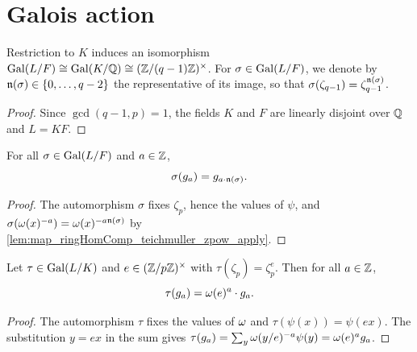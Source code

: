 \section{Galois action}

\begin{lemma}
  \label{lem:galFEquiv}
  \leanok
  Restriction to $K$ induces an isomorphism $\mathrm{Gal}(L/F) \cong \mathrm{Gal}(K/\mathbb{Q}) \cong
  (\mathbb{Z}/(q-1)\mathbb{Z})^\times$. For $\sigma \in \mathrm{Gal}(L/F)$, we denote by
  $\mathfrak{n}(\sigma) \in \{0, \ldots, q-2\}$ the representative of its image, so that
  $\sigma(\zeta_{q-1}) = \zeta_{q-1}^{\mathfrak{n}(\sigma)}$.
\end{lemma}

\begin{proof}
  \leanok
  Since $\gcd(q-1, p) = 1$, the fields $K$ and $F$ are linearly disjoint over $\mathbb{Q}$ and
  $L = KF$.
\end{proof}

\begin{lemma}
  \label{lem:gal_gaussSum_eq_gaussSum}
  \leanok
  For all $\sigma \in \mathrm{Gal}(L/F)$ and $a \in \mathbb{Z}$,
  \[
    \sigma(g_a) = g_{a \cdot \mathfrak{n}(\sigma)}.
  \]
\end{lemma}

\begin{proof}
  \leanok
  The automorphism $\sigma$ fixes $\zeta_p$, hence the values of $\psi$, and
  $\sigma(\omega(x)^{-a}) = \omega(x)^{-a \mathfrak{n}(\sigma)}$ by
  \ref{lem:map_ringHomComp_teichmuller_zpow_apply}.
\end{proof}

\begin{lemma}
  \label{lem:gauss_sum_galois_action_K}
  \leanok
  Let $\tau \in \mathrm{Gal}(L/K)$ and $e \in (\mathbb{Z}/p\mathbb{Z})^\times$ with $\tau(\zeta_p) = \zeta_p^e$.
  Then for all $a \in \mathbb{Z}$,
  \[
    \tau(g_a) = \omega(e)^{a} \cdot g_a.
  \]
\end{lemma}

\begin{proof}
  \leanok
  The automorphism $\tau$ fixes the values of $\omega$ and $\tau(\psi(x)) = \psi(ex)$. The
  substitution $y = ex$ in the sum gives
  $\tau(g_a) = \sum_y \omega(y/e)^{-a}\psi(y) = \omega(e)^{a} g_a$.
\end{proof}

